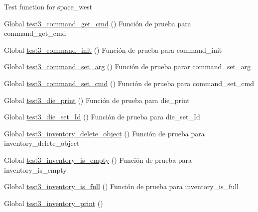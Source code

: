 \begin{DoxyRefList}
%
Test function for space\+\_\+west  
\item[Global \mbox{\hyperlink{command__test_8c_a41e0413cb7402808064a47e714418b0e}{test3\+\_\+command\+\_\+get\+\_\+cmd}} ()]\label{test__test000015}%
%
Función de prueba para command\+\_\+get\+\_\+cmd  
\item[Global \mbox{\hyperlink{command__test_8c_a1d44a3ed59cc78359d6c8c0d720347e1}{test3\+\_\+command\+\_\+init}} ()]\label{test__test000003}%
%
Función de prueba para command\+\_\+init  
\item[Global \mbox{\hyperlink{command__test_8c_a42428bbf6c21406f8f2a36fd1c33e402}{test3\+\_\+command\+\_\+set\+\_\+arg}} ()]\label{test__test000018}%
%
Función de prueba parar command\+\_\+set\+\_\+arg  
\item[Global \mbox{\hyperlink{command__test_8c_a95514b5ec42e57daa0d4899271979e7e}{test3\+\_\+command\+\_\+set\+\_\+cmd}} ()]\label{test__test000012}%
%
Función de prueba para command\+\_\+set\+\_\+cmd  
\item[Global \mbox{\hyperlink{die__test_8c_a62332d2e0e931c7f9be50ae465157911}{test3\+\_\+die\+\_\+print}} ()]\label{test__test000035}%
%
Función de prueba para die\+\_\+print  
\item[Global \mbox{\hyperlink{die__test_8c_a59002b3b047f105c24501a3350c183d3}{test3\+\_\+die\+\_\+set\+\_\+\+Id}} ()]\label{test__test000028}%
%
Función de prueba para die\+\_\+set\+\_\+\+Id  
\item[Global \mbox{\hyperlink{inventory__test_8c_a66005d07626ca1dae670ddc7fc3a9514}{test3\+\_\+inventory\+\_\+delete\+\_\+object}} ()]\label{test__test000053}%
%
Función de prueba para inventory\+\_\+delete\+\_\+object  
\item[Global \mbox{\hyperlink{inventory__test_8c_a9c8daeb141dbec6ddd5621edade53091}{test3\+\_\+inventory\+\_\+is\+\_\+empty}} ()]\label{test__test000058}%
%
Función de prueba para inventory\+\_\+is\+\_\+empty  
\item[Global \mbox{\hyperlink{inventory__test_8c_a540dbcbfd29bd63590d081e496f8227f}{test3\+\_\+inventory\+\_\+is\+\_\+full}} ()]\label{test__test000061}%
%
Función de prueba para inventory\+\_\+is\+\_\+full  
\item[Global \mbox{\hyperlink{inventory__test_8c_a61946792fc191994e1d93674df794cbd}{test3\+\_\+inventory\+\_\+print}} ()]\label{test__test000050}%

\end{DoxyRefList}
